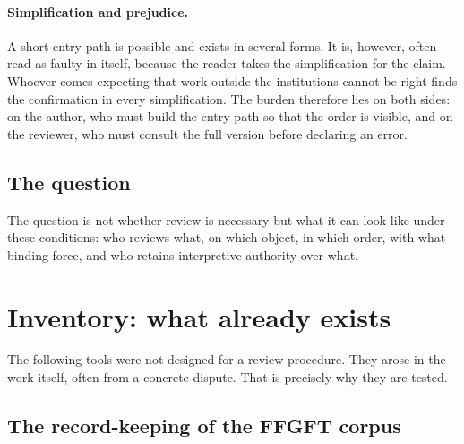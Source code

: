 \paragraph{Simplification and prejudice.} A short entry path is possible and exists in
several forms. It is, however, often read as faulty in itself, because the reader takes
the simplification for the claim. Whoever comes expecting that work outside the
institutions cannot be right finds the confirmation in every simplification. The burden
therefore lies on both sides: on the author, who must build the entry path so that the
order is visible, and on the reviewer, who must consult the full version before declaring
an error.

\subsection{The question}

The question is not whether review is necessary but what it can look like under these
conditions: who reviews what, on which object, in which order, with what binding force,
and who retains interpretive authority over what.

\section{Inventory: what already exists}

The following tools were not designed for a review procedure. They arose in the work
itself, often from a concrete dispute. That is precisely why they are tested.

\subsection{The record-keeping of the FFGFT corpus}


